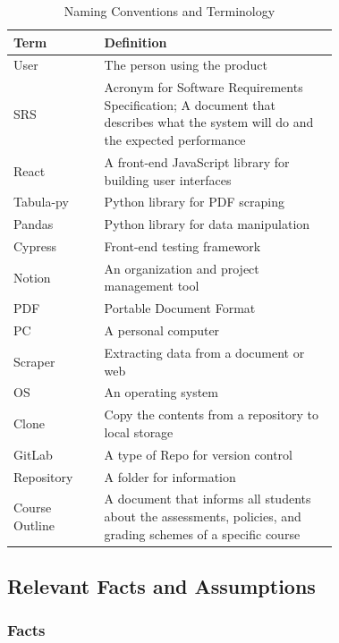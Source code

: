 \documentclass[12pt, titlepage]{article}
\begin{document}
\begin{table}[!ht]
\begin{center}
    \centering
    \begin{tabular}{|l|p{0.72\linewidth}|}
     \hline
     \textbf{Term} & \textbf{Definition} \\
     \hline
     User & The person using the product \\
     \hline
     SRS & Acronym for Software Requirements Specification; A document that describes what the system will do and the expected performance \\
     \hline
     React & A front-end JavaScript library for building user interfaces\\
     \hline
     Tabula-py & Python library for PDF scraping \\
     \hline
     Pandas & Python library for data manipulation \\
     \hline
     Cypress & Front-end testing framework \\
     \hline
     Notion & An organization and project management tool \\
     \hline
     PDF & Portable Document Format \\
     \hline
     PC & A personal computer \\
     \hline
     Scraper & Extracting data from a document or web \\
     \hline
     OS & An operating system\\
     \hline
     Clone & Copy the contents from a repository to local storage  \\
     \hline
     GitLab & A type of Repo for version control \\
     \hline
     Repository & A folder for information \\
     \hline
     Course Outline & A document that informs all students about the assessments, policies, and grading schemes of a specific course \\
     \hline
    \end{tabular}
    \caption{Naming Conventions and Terminology}
    \end{center}
\end{table}

\newpage

\subsection{Relevant Facts and Assumptions}

\subsubsection{Facts}
\end{document}
